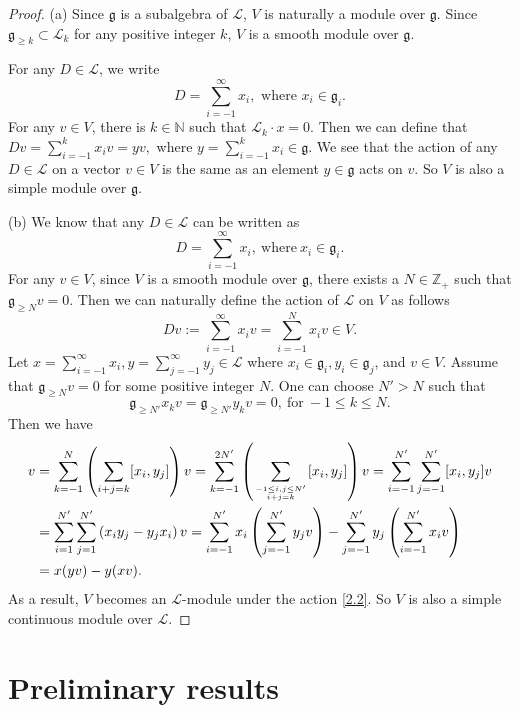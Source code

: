 \documentclass[12pt, a4paper]{amsart}
\newcommand{\fg}{\mathfrak g}
\theoremstyle{Theorem}
\theoremstyle{Theorem}
\numberwithin{equation}{section}
\begin{document}
\begin{proof}
	(a) Since $\mathfrak{g}$ is a   subalgebra of  $\mathcal{L}$, $V$ is naturally a module over $\fg$. Since $\mathfrak{g}_{\ge k}\subset \mathcal{L}_k$ for any positive integer $k$,
	$V$  is a smooth module over $\fg$.
	
	For any $D\in \mathcal{L}$, we write
	$$D=\sum_{i=-1}^\infty x_i, \text{ where }x_i\in \fg_i.
	$$
	For any $v\in V$, there is $k\in\mathbb{N} $ such that $
	\mathcal{L}_k\cdot x = 0.
	$
	Then we can define that $Dv=\sum\limits_{i=-1}^k x_iv=yv,$ where $y=\sum\limits_{i=-1}^k x_i\in \fg$. We see that the action of any $D\in \mathcal{L}$ on a vector $v\in V$ is the same as an element $y\in \fg$ acts on $v$. So $V$ is also a simple module over $\fg$.
	
	(b) We  know that any $D\in \mathcal{L} $ can be written as $$D=\sum_{i=-1 }^{\infty}x_i, \ \text{where} \ x_i \in \fg_i.$$
	For any $v \in V$, since $V$ is a smooth module over $\fg$,  there exists a $N \in \mathbb{Z}_+$ such that $
	\mathfrak{g}_{\geq N}v = 0$.
	Then we can naturally define the action of $\mathcal{L}$ on $V$ as follows
	\begin{equation}\label{2.2}
		Dv:= \sum_{i=-1 }^{\infty}x_iv= \sum_{i=-1 }^{N}x_iv\in V.
	\end{equation}
	Let $x=\sum\limits_{i=-1}^{\infty} x_i, y=\sum\limits_{j=-1}^{\infty} y_j\in\mathcal{L}$ where $x_i \in \fg_i, y_i\in \fg_j$,  and $v\in V$. Assume that $\mathfrak{g}_{\ge N}v=0$ for some positive integer $N$. One can choose $N'>N$ such that
	\begin{equation*}
		\mathfrak{g}_{\ge N'}x_kv=	\mathfrak{g}_{\ge N'}y_kv=0,~\text{for} \ -1\le k\le N.
	\end{equation*}
	Then we have
	\begin{align*}
		[x,y]v&=\sum_{k=-1}^{N}\left(\sum_{ i+j=k}[x_i,y_j]\right)v=\sum_{k=-1}^{2N'}\left(\sum_{-1\le i,j\le N'\atop i+j=k}[x_i,y_j]\right)v
		=\sum_{i=-1}^{N'}\sum_{j=-1}^{N'}[x_i,y_j]v\\
		&=\sum_{i=1}^{N'}\sum_{j=1}^{N'}\left(x_iy_j-y_jx_i\right)v
		=\sum_{i=-1}^{N'}x_i\left(\sum_{j=-1}^{N'}y_jv\right)-\sum_{j=-1}^{N'}y_j\left(\sum_{i=-1}^{N'}x_iv\right)\\
		&=x(yv)-y(xv).
	\end{align*}
	As a result, $V$ becomes an $\mathcal{L} $-module under the action \eqref{2.2}.
	So $V$ is also a simple continuous module over $\mathcal{L}$.
\end{proof}

\section{Preliminary results}
\end{document}
